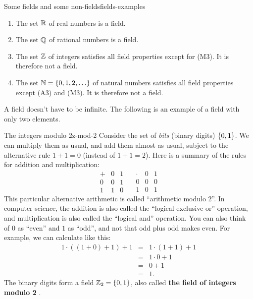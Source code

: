 \begin{example}{Some fields and some non-fields}{fields-examples}
  \begin{enumialphparenastyle}
    \begin{enumerate}
    \item The set $\mathbb{R}$ of real numbers is a field.
    \item The set $\mathbb{Q}$ of rational numbers is a field.
    \item The set $\mathbb{Z}$ of integers satisfies all field
      properties except for (M3). It is therefore not a field.
    \item The set $\mathbb{N}=\left\{0,1,2,\ldots\right\}$ of natural numbers
      satisfies all field properties except (A3) and (M3). It is
      therefore not a field.
    \end{enumerate}
  \end{enumialphparenastyle}
\end{example}

A field doesn't have to be infinite. The following is an example of a
field with only two elements.

\begin{example}{The integers modulo 2}{z-mod-2}
  Consider the set of {\em bits} (binary digits) $\left\{0,1\right\}$.
  We can multiply them as usual, and add them almost as usual, subject
  to the alternative rule $1+1=0$ (instead of $1+1=2$). Here is a
  summary of the rules for addition and multiplication:
  \begin{equation*}
    \begin{array}{l|ll}
      +&0&1 \\\hline
      0&0&1 \\
      1&1&0
    \end{array}
    \quad
    \begin{array}{l|ll}
      \cdot&0&1 \\\hline
      0&0&0 \\
      1&0&1
    \end{array}
  \end{equation*}
  This particular alternative arithmetic is called ``arithmetic modulo
  2''.  In computer science, the addition is also called the ``logical
  exclusive or'' operation, and
  multiplication is also called the ``logical and''
  operation. You can also think of $0$ as
  ``even'' and $1$ as ``odd'', and not that odd plus odd makes
  even. For example, we can calculate like this:
  \begin{equation*}
    \begin{array}{lll}
      1\cdot((1+0)+1) + 1 &=& 1\cdot(1+1) + 1\\
                          &=& 1\cdot 0 + 1\\
                          &=& 0 + 1\\
                          &=& 1.
    \end{array}
  \end{equation*}
  The binary digits form a field $\mathbb{Z}_2 = \left\{0,1\right\}$, also
  called \textbf{the field of integers modulo 2}%
  .
\end{example}

